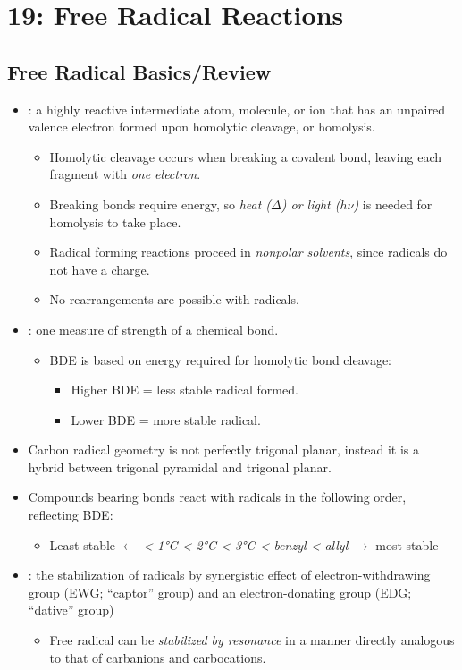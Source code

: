 \chapter{19: Free Radical Reactions}\label{19: Free Radical Reactions}
\section{Free Radical Basics/Review}\label{Free Radical Basics/Review}
\begin{itemize}
    \item {}: a highly reactive intermediate atom, molecule, or ion that has an unpaired valence electron formed upon homolytic cleavage, or homolysis. 
      \begin{itemize}
        \item Homolytic cleavage occurs when breaking a covalent bond, leaving each fragment with \emph{one electron}.
        \item Breaking bonds require energy, so \emph{heat (\(\Delta \)) or light (\(h\nu \))} is needed for homolysis to take place.
        \item Radical forming reactions proceed in \emph{nonpolar solvents}, since radicals do not have a charge.
        \item No rearrangements are possible with radicals.
      \end{itemize}
    \item {}: one measure of strength of a chemical bond. 
      \begin{itemize}
        \item BDE is based on energy required for homolytic bond cleavage:
          \begin{itemize}
            \item Higher BDE = less stable radical formed.
            \item Lower BDE = more stable radical.
          \end{itemize}
      \end{itemize}
    \item Carbon radical geometry is not perfectly trigonal planar, instead it is a hybrid between trigonal pyramidal and trigonal planar.
    \item Compounds bearing  bonds react with radicals in the following order, reflecting  BDE\@:
      \begin{itemize}
        \item Least stable \(\leftarrow \) \emph{ < \ang{1}C < \ang{2}C < \ang{3}C < benzyl < allyl} \(\rightarrow \) most stable
      \end{itemize}
    \item {}: the stabilization of radicals by synergistic effect of electron-withdrawing group (EWG\@; ``captor'' group) and an electron-donating group (EDG\@; ``dative'' group)
      \begin{itemize}
        \item Free radical can be \emph{stabilized by resonance }in a manner directly analogous to that of carbanions and carbocations.
      \end{itemize} 
\end{itemize}

